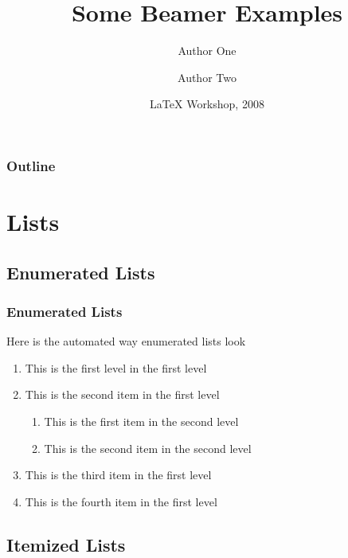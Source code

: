 \documentclass[noamsthm]{beamer}
\title[Beamer Examples] %
{Some Beamer Examples}
\author[Author1,Author2] %
{Author One  \and Author Two }
\institute[Concordia] %
{Concordia University}
\date[LaTeX 2008] %
{LaTeX Workshop, 2008}
\begin{document}
\begin{frame}
  \titlepage
\end{frame}

\begin{frame}
  \frametitle{Outline}
  \tableofcontents
\end{frame}

\section{Lists}

\subsection{Enumerated Lists}

\begin{frame}
\frametitle{Enumerated Lists}


Here is the automated way enumerated lists look

\begin{enumerate}
	\item This is the first level in the first level
	\item This is the second item in the first level
	\begin{enumerate}
	\item This is the first item in the second level
	\item This is the second item in the second level
	
\end{enumerate}
	\item This is the third item in the first level
	\item This is the fourth item in the first level
\end{enumerate}

\end{frame}

\subsection{Itemized Lists}
\end{document}
